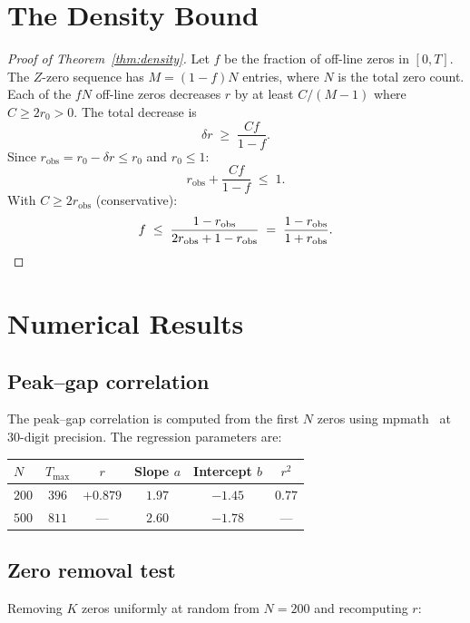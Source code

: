 \documentclass[11pt,a4paper]{article}
\begin{document}
\section{The Density Bound}\label{sec:density}

\begin{proof}[Proof of Theorem~\ref{thm:density}]
Let $f$ be the fraction of off-line zeros in $[0, T]$.
The $Z$-zero sequence has $M = (1{-}f)N$ entries, where $N$ is the total zero count.
Each of the $fN$ off-line zeros decreases $r$ by at least $C/(M{-}1)$ where $C \geq 2r_0 > 0$.
The total decrease is
\[
\delta r \;\geq\; \frac{Cf}{1-f}.
\]
Since $r_{\mathrm{obs}} = r_0 - \delta r \leq r_0$ and $r_0 \leq 1$:
\[
r_{\mathrm{obs}} + \frac{Cf}{1-f} \;\leq\; 1.
\]
With $C \geq 2r_{\mathrm{obs}}$ (conservative):
\[
f \;\leq\; \frac{1-r_{\mathrm{obs}}}{2r_{\mathrm{obs}} + 1 - r_{\mathrm{obs}}} \;=\; \frac{1-r_{\mathrm{obs}}}{1+r_{\mathrm{obs}}}. \qedhere
\]
\end{proof}


\section{Numerical Results}

\subsection{Peak--gap correlation}
The peak--gap correlation is computed from the first $N$ zeros using mpmath~\cite{mpmath} at $30$-digit precision.
The regression parameters are:

\begin{center}
\begin{tabular}{lccccc}
\toprule
$N$ & $T_{\max}$ & $r$ & Slope $a$ & Intercept $b$ & $r^2$ \\
\midrule
$200$ & $396$ & $+0.879$ & $1.97$ & $-1.45$ & $0.77$ \\
$500$ & $811$ & --- & $2.60$ & $-1.78$ & --- \\
\bottomrule
\end{tabular}
\end{center}

\subsection{Zero removal test}
Removing $K$ zeros uniformly at random from $N = 200$ and recomputing $r$:
\end{document}
